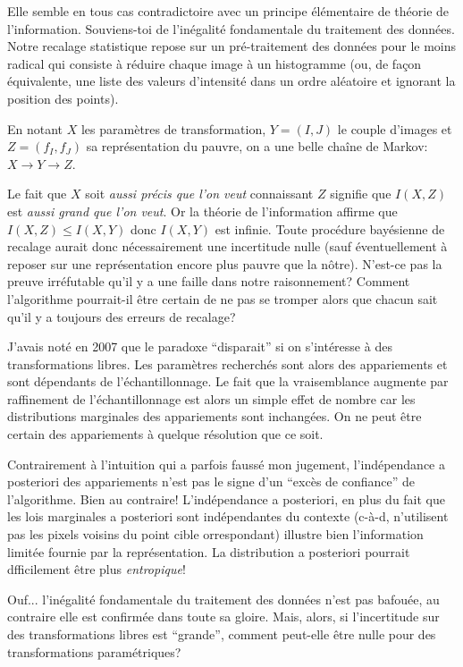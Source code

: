 \documentclass{article}
\begin{document}
Elle semble en tous cas contradictoire avec un principe \'el\'ementaire de th\'eorie de l'information. Souviens-toi de l'in\'egalit\'e fondamentale du traitement des donn\'ees. Notre recalage statistique repose sur un pr\'e-traitement des donn\'ees pour le moins radical qui consiste \`a r\'eduire chaque image \`a un histogramme (ou, de fa\c{c}on \'equivalente, une liste des valeurs d'intensit\'e dans un ordre al\'eatoire et ignorant la position des points). 

En notant $X$ les param\`etres de transformation, $Y=(I, J)$ le couple d'images et $Z=(f_I, f_J)$ sa repr\'esentation du pauvre, on a une belle cha\^ine de Markov: $X \to Y \to Z$.

Le fait que $X$ soit {\em aussi pr\'ecis que l'on veut} connaissant $Z$ signifie que $I(X,Z)$ est {\em aussi grand que l'on veut}. Or la th\'eorie de l'information affirme que $I(X,Z) \leq I(X,Y)$ donc $I(X,Y)$ est infinie. Toute proc\'edure bay\'esienne de recalage aurait donc n\'ecessairement une incertitude nulle (sauf \'eventuellement \`a reposer sur une repr\'esentation encore plus pauvre que la n\^otre). N'est-ce pas la preuve irr\'efutable qu'il y a une faille dans notre raisonnement? Comment l'algorithme pourrait-il \^etre certain de ne pas se tromper alors que chacun sait qu'il y a toujours des erreurs de recalage? 

J'avais not\'e en 2007 que le paradoxe ``disparait'' si on s'int\'eresse \`a des transformations libres. Les param\`etres recherch\'es sont alors des appariements et sont d\'ependants de l'\'echantillonnage. Le fait que la vraisemblance augmente par raffinement de l'\'echantillonnage est alors un simple effet de nombre car les distributions marginales des appariements sont inchang\'ees. On ne peut \^etre certain des appariements \`a quelque r\'esolution que ce soit. 

Contrairement \`a l'intuition qui a parfois fauss\'e mon jugement, l'ind\'ependance a posteriori des appariements n'est pas le signe d'un ``exc\`es de confiance'' de l'algorithme. Bien au contraire! L'ind\'ependance a posteriori, en plus du fait que les lois marginales a posteriori sont ind\'ependantes du contexte (c-\`a-d, n'utilisent pas les pixels voisins du point cible orrespondant) illustre bien l'information limit\'ee fournie par la repr\'esentation. La distribution a posteriori pourrait dfficilement \^etre plus {\em entropique}! 

Ouf... l'in\'egalit\'e fondamentale du traitement des donn\'ees n'est pas bafou\'ee, au contraire elle est confirm\'ee dans toute sa gloire.  Mais, alors, si l'incertitude sur des transformations libres est ``grande'', comment peut-elle \^etre nulle pour des transformations param\'etriques? 
\end{document}

